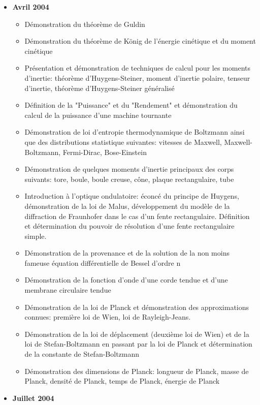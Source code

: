 \begin{itemize}
\begin{itemize}[noitemsep]
			\end{itemize}
		\item \textbf{Avril 2004}
			\begin{itemize}[noitemsep]
				\item Démonstration du théorème de Guldin
				\item Démonstration du théorème de König de l'énergie cinétique et du moment cinétique
				\item Présentation et démonstration de techniques de calcul pour les moments d'inertie: théorème d'Huygens-Steiner, moment d'inertie polaire, tenseur d'inertie, théorème d'Huygens-Steiner généralisé
				\item Définition de la "Puissance" et du "Rendement" et démonstration du calcul de la puissance d'une machine tournante
				\item Démonstration de loi d'entropie thermodynamique de Boltzmann ainsi que des distributions statistique suivantes: vitesses de Maxwell, Maxwell-Boltzmann, Fermi-Dirac, Bose-Einstein
				\item Démonstration de quelques moments d'inertie principaux des corps suivants: tore, boule, boule creuse, cône, plaque rectangulaire, tube
				\item Introduction à l'optique ondulatoire: éconcé du principe de Huygens, démonstration de la loi de Malus, développement du modèle de la diffraction de Fraunhofer dans le cas d'un fente rectangulaire. Définition et détermination du pouvoir de résolution d'une fente rectangulaire simple.
				\item Démonstration de la provenance et de la solution de la non moins fameuse équation différentielle de Bessel d'ordre n
				\item Démonstration de la fonction d'onde d'une corde tendue et d'une membrane circulaire tendue
				\item Démonstration de la loi de Planck et démonstration des approximations connues: première loi de Wien, loi de Rayleigh-Jeans.
				\item Démonstration de la loi de déplacement (deuxième loi de Wien) et de la loi de Stefan-Boltzmann en passant par la loi de Planck et détermination de la constante de Stefan-Boltzmann
				\item Démonstration des dimensions de Planck: longueur de Planck, masse de Planck, densité de Planck, temps de Planck, énergie de Planck
			\end{itemize}
		\item \textbf{Juillet 2004}
			\begin{itemize}[noitemsep]

\end{itemize}
\end{itemize}
